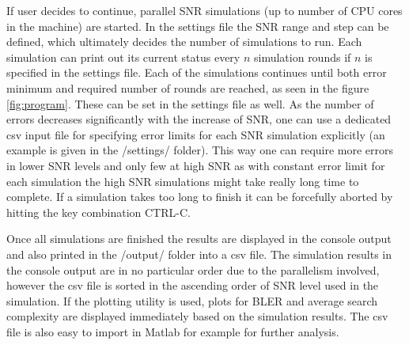 \documentclass[english,12pt,a4paper,pdftex,sci,utf8]{aaltothesis}
\begin{document}
\par If user decides to continue, parallel SNR simulations (up to number of CPU cores in the machine) are started. In the settings file the SNR range and step can be defined, which ultimately decides the number of simulations to run. Each simulation can print out its current status every $n$ simulation rounds if $n$ is specified in the settings file. Each of the simulations continues until both error minimum and required number of rounds are reached, as seen in the figure \ref{fig:program}. These can be set in the settings file as well. As the number of errors decreases significantly with the increase of SNR, one can use a dedicated csv input file for specifying error limits for each SNR simulation explicitly (an example is given in the /settings/ folder). This way one can require more errors in lower SNR levels and only few at high SNR as with constant error limit for each simulation the high SNR simulations might take really long time to complete. If a simulation takes too long to finish it can be forcefully aborted by hitting the key combination CTRL-C.
\par Once all simulations are finished the results are displayed in the console output and also printed in the /output/ folder into a csv file. The simulation results in the console output are in no particular order due to the parallelism involved, however the csv file is sorted in the ascending order of SNR level used in the simulation. If the plotting utility is used, plots for BLER and average search complexity are displayed immediately based on the simulation results. The csv file is also easy to import in Matlab for example for further analysis. 
\end{document}
